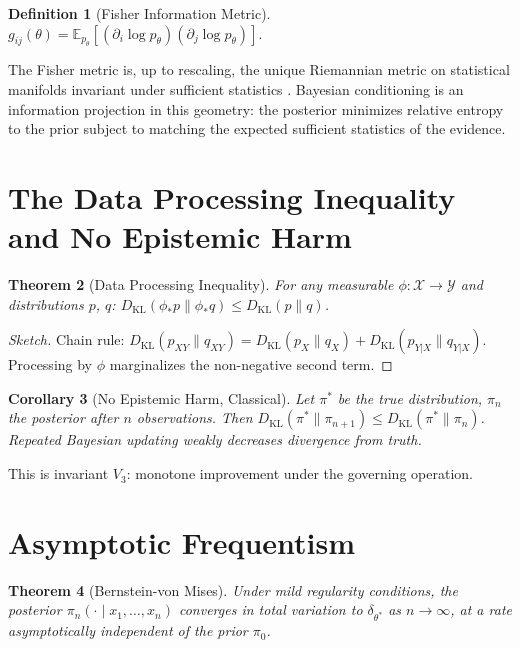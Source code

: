 \documentclass[12pt,oneside]{book}
\theoremstyle{plain}
\newtheorem{theorem}{Theorem}[chapter]
\newtheorem{corollary}[theorem]{Corollary}
\theoremstyle{definition}
\newtheorem{definition}[theorem]{Definition}
\theoremstyle{remark}
\newcommand{\KL}{D_{\mathrm{KL}}}
\begin{document}
\begin{definition}[Fisher Information Metric]
$g_{ij}(\theta) = \mathbb{E}_{p_\theta}
[(\partial_i\log p_\theta)(\partial_j\log p_\theta)]$.
\end{definition}

The Fisher metric is, up to rescaling, the unique Riemannian metric on
statistical manifolds invariant under sufficient statistics
\cite{chentsov1982}. Bayesian conditioning is an information projection in
this geometry: the posterior minimizes relative entropy to the prior subject
to matching the expected sufficient statistics of the evidence.

\section{The Data Processing Inequality and No Epistemic Harm}

\begin{theorem}[Data Processing Inequality]
For any measurable $\phi : \mathcal{X} \to \mathcal{Y}$ and distributions $p$, $q$:
$\KL(\phi_* p \| \phi_* q) \leq \KL(p \| q)$.
\end{theorem}

\begin{proof}[Sketch]
Chain rule: $\KL(p_{XY} \| q_{XY}) = \KL(p_X \| q_X) +
\KL(p_{Y|X} \| q_{Y|X})$. Processing by $\phi$ marginalizes the
non-negative second term.
\end{proof}

\begin{corollary}[No Epistemic Harm, Classical]
\label{cor:NEH}
Let $\pi^*$ be the true distribution, $\pi_n$ the posterior after $n$
observations. Then $\KL(\pi^* \| \pi_{n+1}) \leq \KL(\pi^* \| \pi_n)$.
Repeated Bayesian updating weakly decreases divergence from truth.
\end{corollary}

This is invariant $V_3$: monotone improvement under the governing operation.

\section{Asymptotic Frequentism}

\begin{theorem}[Bernstein-von Mises]
Under mild regularity conditions, the posterior $\pi_n(\cdot \mid x_1,\ldots,
x_n)$ converges in total variation to $\delta_{\theta^*}$ as $n \to \infty$,
at a rate asymptotically independent of the prior $\pi_0$.
\end{theorem}
\end{document}
